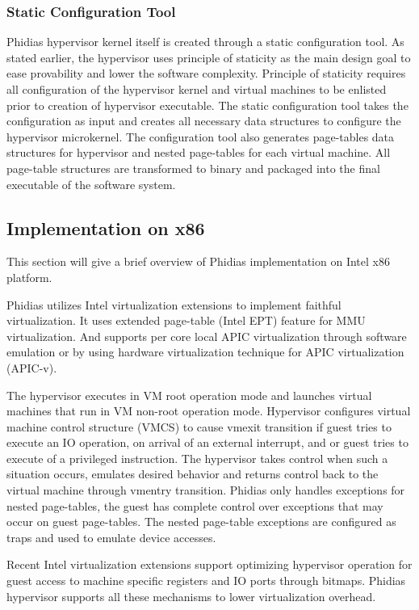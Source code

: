\subsubsection{Static Configuration Tool}
Phidias hypervisor kernel itself is created through a static configuration tool. 
As stated earlier, the hypervisor uses principle of staticity as the main design goal to ease provability and lower the software complexity.
Principle of staticity requires all configuration of the hypervisor kernel and virtual machines to be enlisted prior to creation of hypervisor executable. 
The static configuration tool takes the configuration as input and creates all necessary data structures to configure the hypervisor microkernel. 
The configuration tool also generates page-tables data structures for hypervisor and nested page-tables for each virtual machine. 
All page-table structures are transformed to binary and packaged into the final executable of the software system.


\subsection{Implementation on x86}
This section will give a brief overview of Phidias implementation on Intel x86 platform.

Phidias utilizes Intel virtualization extensions to implement faithful virtualization. 
It uses extended page-table (Intel EPT) feature for MMU virtualization. 
And supports per core local APIC virtualization through software
emulation or by using hardware virtualization technique for APIC virtualization (APIC-v).

The hypervisor executes in VM root operation mode and launches virtual machines that run in VM non-root operation mode.
Hypervisor configures virtual machine control structure (VMCS) to cause vmexit transition if guest tries to execute an IO operation, on arrival of an external interrupt, and or guest tries to execute of a privileged instruction.  
The hypervisor takes control when such a situation occurs, emulates desired behavior and returns control back to the virtual machine through vmentry transition. 
Phidias only handles exceptions for nested page-tables, the guest has complete control over exceptions that may occur on guest page-tables.
The nested page-table exceptions are configured as traps and used to emulate device accesses. 

Recent Intel virtualization extensions support optimizing hypervisor operation for guest access to machine specific registers and IO ports through bitmaps.
Phidias hypervisor supports all these mechanisms to lower virtualization overhead. 

